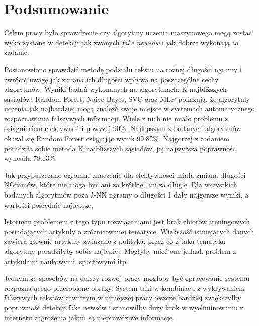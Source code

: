 \chapter{Podsumowanie}
Celem pracy było sprawdzenie czy algorytmy uczenia maszynowego mogą zostać wykorzystane
w detekcji tak zwanych \textit{fake newsów} i jak dobrze wykonają to zadanie.


Postanowiono sprawdzić metodę podziału tekstu na rożnej długości ngramy i zwrócić uwagę 
jak zmiana ich długości wpływa na poszczególne cechy algorytmów.
Wyniki badań wykonanych na algorytmach: K najbliższych sąsiadów, Random Forest, Naive Bayes,
SVC oraz MLP pokazują, że algorytmy uczenia jak najbardziej mogą znaleźć swoje miejsce w systemach
automatycznego rozpoznawania fałszywych informacji. Wiele z nich nie miało problemu z osiągnieciem 
efektywności powyżej 90\%. Najlepszym z badanych algorytmów okazał się Random Forest osiągając
wynik 99.82\%. Najgorzej z zadaniem poradziła sobie metoda K najblizszych sąsiadów, jej najwyższa 
poprawność wynosiła 78.13\%.

Jak przypuszczano ogromne znaczenie dla efektywności
miała zmiana długości NGramów, które nie mogą być ani za krótkie, ani za długie.
Dla wszystkich badanych algorytmów poza \textit{k}-NN ngramy o długości 1 dały najgorsze wyniki, a wartości
pośrednie najlepsze.

Istotnym problemem z tego typu rozwiązaniami jest brak zbiorów treningowych posiadających 
artykuły o zróżnicowanej tematyce. Większość istniejących danych zawiera głownie artykuły związane z 
polityką, przez co z taką tematyką algorytmy poradziłyby sobie najlepiej. Mogłyby mieć one jednak problem 
z artykułami naukowymi, sportowymi itp.

Jednym ze sposobów na dalszy rozwój pracy mogłoby być opracowanie systemu rozpoznającego 
przerobione obrazy. System taki w kombinacji z wykrywaniem fałszywych tekstów zawartym
w niniejszej pracy jeszcze bardziej zwiększyłby poprawność detekcji fake newsów i stanowiłby 
duży krok w wyeliminowaniu z internetu zagrożenia jakim są nieprawdziwe informacje.